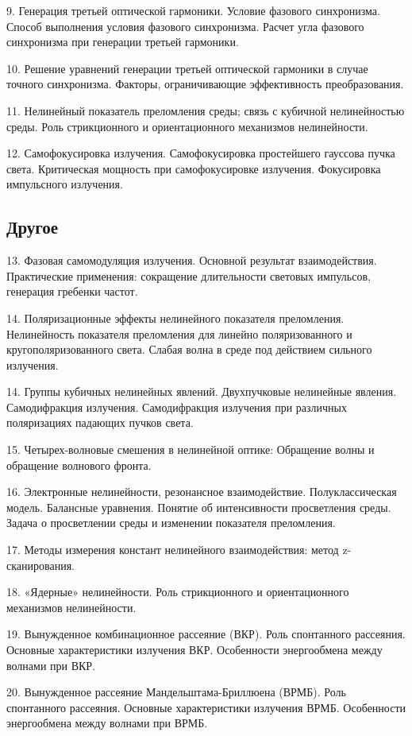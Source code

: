 9. Генерация третьей оптической гармоники. Условие фазового синхронизма. Способ выполнения условия фазового синхронизма. Расчет угла фазового синхронизма при генерации третьей гармоники.

10. Решение уравнений генерации третьей оптической гармоники в случае точного синхронизма. Факторы, ограничивающие эффективность преобразования.

11. Нелинейный показатель преломления среды; связь с кубичной нелинейностью среды. Роль стрикционного и ориентационного механизмов нелинейности.

12. Самофокусировка излучения. Самофокусировка простейшего гауссова пучка света. Критическая мощность при самофокусировке излучения. Фокусировка импульсного излучения.


\subsection*{Другое}

13. Фазовая самомодуляция излучения. Основной результат взаимодействия. Практические применения: сокращение длительности световых импульсов, генерация гребенки частот.

14. Поляризационные эффекты нелинейного показателя преломления. Нелинейность показателя преломления для линейно поляризованного и кругополяризованного света. Слабая волна в среде под действием сильного излучения.

14. Группы кубичных нелинейных явлений. Двухпучковые нелинейные явления. Самодифракция излучения. Самодифракция излучения при различных поляризациях падающих пучков света.

15. Четырех-волновые смешения в нелинейной оптике: Обращение волны и обращение волнового фронта.

16. Электронные нелинейности, резонансное взаимодействие. Полуклассическая модель. Балансные уравнения. Понятие об интенсивности просветления среды. Задача о просветлении среды и изменении показателя преломления.

17. Методы измерения констант нелинейного взаимодействия: метод z-сканирования.

18. «Ядерные» нелинейности. Роль стрикционного и ориентационного механизмов нелинейности.

19. Вынужденное комбинационное рассеяние (ВКР). Роль спонтанного рассеяния. Основные характеристики излучения ВКР. Особенности энергообмена между волнами при ВКР.

20. Вынужденное рассеяние Мандельштама-Бриллюена (ВРМБ). Роль спонтанного рассеяния. Основные характеристики излучения ВРМБ. Особенности энергообмена между волнами при ВРМБ.